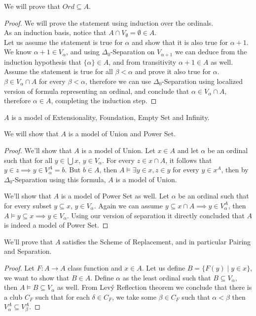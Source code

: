 \subquestion{}
We will prove that $Ord \subseteq A$.
\begin{proof}
	We will prove the statement using induction over the ordinals. \\
	As an induction basis, notice that $A \cap V_\emptyset = \emptyset \in A$. \\
	Let us assume the statement is true for $\alpha$ and show that it is also true for $\alpha + 1$.
	We know $\alpha + 1 \in V_{\alpha}$, and using $\Delta_0$-Separation on $V_{\alpha + 1}$ we can deduce from the induction hypothesis that $\{\alpha\} \in A$, and from transitivity $\alpha + 1 \in A$ as well. \\
	Assume the statement is true for all $\beta < \alpha$ and prove it also true for $\alpha$.
	$\beta \in V_\alpha \cap A$ for every $\beta < \alpha$, therefore we can use $\Delta_0$-Separation using localized version of formula representing an ordinal,
	and conclude that $\alpha \in V_\alpha \cap A$, therefore $\alpha \in A$, completing the induction step.
\end{proof}
\begin{remark}
	$A$ is a model of Extensionality, Foundation, Empty Set and Infinity.
\end{remark}

\subquestion{}
We will show that $A$ is a model of Union and Power Set.
\begin{proof}
	We'll show that $A$ is a model of Union.
	Let $x \in A$ and let $\alpha$ be an ordinal such that for all $y \in \bigcup x$, $y \in V_\alpha$.
	For every $z \in x \cap A$, it follows that $y \in z \implies y \in V_\alpha^A = b$.
	But $b \in A$, then $A \models \exists y \in x, z \in y$ for every $y \in x^A$, then by $\Delta_0$-Separation using this formula, $A$ is a model of Union.

	We'll show that $A$ is a model of Power Set as well.
	Let $\alpha$ be an ordinal such that for every subset $y \subseteq x$, $y \in V_\alpha$.
	Again we can assume $y \subseteq x \cap A \implies y \in V_\alpha^A$, then $A \models y \subseteq x \implies y \in V_\alpha$.
	Using our version of separation it directly concluded that $A$ is indeed a model of Power Set.
\end{proof}

\subquestion{}
We'll prove that $A$ satisfies the Scheme of Replacement, and in particular Pairing and Separation.
\begin{proof}
	Let $F : A \to A$ class function and $x \in A$.
	Let us define $B = \{ F(y) \mid y \in x \}$, we want to show that $B \in A$.
	Define $\alpha$ as the least ordinal such that $B \subseteq V_\alpha$, then $A \models B \subseteq V_\alpha$ as well.
	From Lev\'y Reflection theorem we conclude that there is a club $C_F$ such that for each $\delta \in C_F$, we take some $\beta \in C_F$ such that $\alpha < \beta$ then $V_\alpha^A \subseteq V_\beta^A$.
\end{proof}



